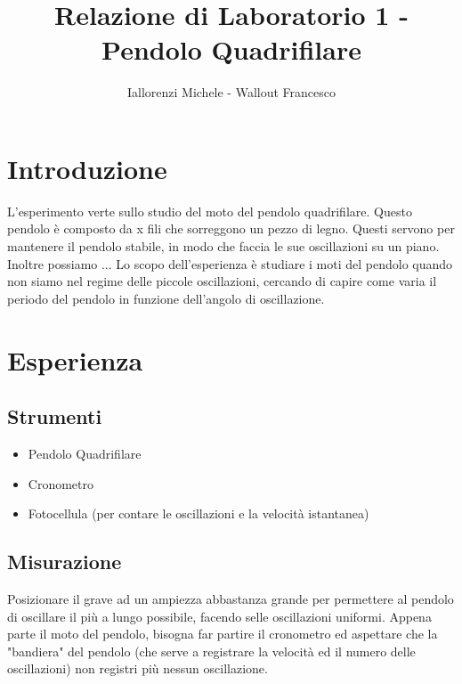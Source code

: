 \documentclass{article}
\title{Relazione di Laboratorio 1 - Pendolo Quadrifilare}
\author{Iallorenzi Michele - Wallout Francesco}
\begin{document}
\maketitle

\section{Introduzione}
    L'esperimento verte sullo studio del moto del pendolo quadrifilare. Questo pendolo è composto da x fili che sorreggono un pezzo di legno. Questi servono per mantenere il pendolo stabile, in modo che faccia le sue oscillazioni su un piano. Inoltre possiamo ...
    Lo scopo dell'esperienza è studiare i moti del pendolo quando non siamo nel regime delle piccole oscillazioni, cercando di capire come varia il periodo del pendolo in funzione dell'angolo di oscillazione.
    
\section{Esperienza}

    \subsection{Strumenti}
    \begin{itemize}
        \item Pendolo Quadrifilare
        \item Cronometro
        \item Fotocellula (per contare le oscillazioni e la velocità istantanea)
    \end{itemize}
    
    \subsection{Misurazione}
    Posizionare il grave ad un ampiezza abbastanza grande per permettere al pendolo di oscillare il più a lungo possibile, facendo selle oscillazioni uniformi. Appena parte il moto del pendolo, bisogna far partire il cronometro ed aspettare che la "bandiera" del pendolo (che serve a registrare la velocità ed il numero delle oscillazioni) non registri più nessun oscillazione.
    
\end{document}
